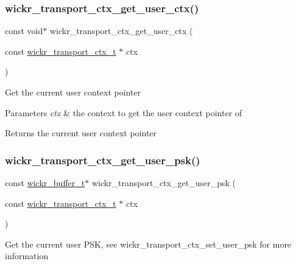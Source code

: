\subsubsection{\texorpdfstring{wickr\+\_\+transport\+\_\+ctx\+\_\+get\+\_\+user\+\_\+ctx()}{wickr\_transport\_ctx\_get\_user\_ctx()}}
{\footnotesize\ttfamily const void$\ast$ wickr\+\_\+transport\+\_\+ctx\+\_\+get\+\_\+user\+\_\+ctx (\begin{DoxyParamCaption}\item[{const \mbox{\hyperlink{structwickr__transport__ctx}{wickr\+\_\+transport\+\_\+ctx\+\_\+t}} $\ast$}]{ctx }\end{DoxyParamCaption})}

Get the current user context pointer


\begin{DoxyParams}{Parameters}
{\em ctx} & the context to get the user context pointer of \\
\hline
\end{DoxyParams}
\begin{DoxyReturn}{Returns}
the current user context pointer 
\end{DoxyReturn}
\mbox{\label{group__wickr__transport__ctx_gabd4c671c3f420e804dae16c662bc71c7}} 
\subsubsection{\texorpdfstring{wickr\+\_\+transport\+\_\+ctx\+\_\+get\+\_\+user\+\_\+psk()}{wickr\_transport\_ctx\_get\_user\_psk()}}
{\footnotesize\ttfamily const \mbox{\hyperlink{structwickr__buffer}{wickr\+\_\+buffer\+\_\+t}}$\ast$ wickr\+\_\+transport\+\_\+ctx\+\_\+get\+\_\+user\+\_\+psk (\begin{DoxyParamCaption}\item[{const \mbox{\hyperlink{structwickr__transport__ctx}{wickr\+\_\+transport\+\_\+ctx\+\_\+t}} $\ast$}]{ctx }\end{DoxyParamCaption})}

Get the current user P\+SK, see \textquotesingle{}wickr\+\_\+transport\+\_\+ctx\+\_\+set\+\_\+user\+\_\+psk\textquotesingle{} for more information


